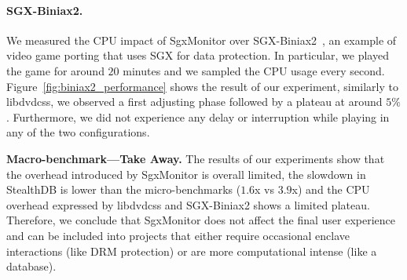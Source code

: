 \paragraph{SGX-Biniax2.}
We measured the CPU impact of SgxMonitor over 
\textsf{SGX-Biniax2}~\citep{bauman2016case}, an example of video game porting 
that uses SGX for data protection.
In particular, we played the game for around $20$ minutes and we sampled the 
CPU usage every second.
Figure~\ref{fig:biniax2_performance} shows the result of our experiment, 
similarly to \textsf{libdvdcss}, we observed a first adjusting phase followed 
by a plateau at around $5\%$.
Furthermore, we did not experience any delay or interruption while playing 
 in any of the two configurations.

\vspace{0.5cm}
\noindent \textbf{Macro-benchmark---Take Away.}
The results of our experiments show that the overhead introduced by 
SgxMonitor is overall limited, \eg the slowdown in \textsf{StealthDB} is lower 
than the micro-benchmarks (\ie $1.6$x vs $3.9$x) and the CPU overhead expressed 
by \textsf{libdvdcss} and \textsf{SGX-Biniax2} shows a limited plateau.
Therefore, we conclude that SgxMonitor does not affect the final user 
experience and can be included into projects that either require occasional 
enclave interactions (like DRM protection) or are more computational intense 
(like a database).




